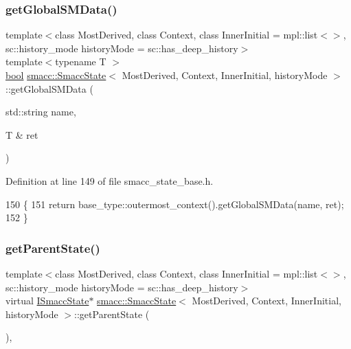 \subsubsection{\texorpdfstring{get\+Global\+S\+M\+Data()}{getGlobalSMData()}}
{\footnotesize\ttfamily template$<$class Most\+Derived, class Context, class Inner\+Initial = mpl\+::list$<$$>$, sc\+::history\+\_\+mode history\+Mode = sc\+::has\+\_\+deep\+\_\+history$>$ \\
template$<$typename T $>$ \\
\hyperlink{classbool}{bool} \hyperlink{classsmacc_1_1SmaccState}{smacc\+::\+Smacc\+State}$<$ Most\+Derived, Context, Inner\+Initial, history\+Mode $>$\+::get\+Global\+S\+M\+Data (\begin{DoxyParamCaption}\item[{std\+::string}]{name,  }\item[{T \&}]{ret }\end{DoxyParamCaption})\hspace{0.3cm}{\ttfamily [inline]}}



Definition at line 149 of file smacc\+\_\+state\+\_\+base.\+h.


\begin{DoxyCode}
150     \{
151       \textcolor{keywordflow}{return} base\_type::outermost\_context().getGlobalSMData(name, ret);
152     \}
\end{DoxyCode}
\mbox{\label{classsmacc_1_1SmaccState_a69fc0aa1dbe0c00501f2890616225004}} 
\subsubsection{\texorpdfstring{get\+Parent\+State()}{getParentState()}}
{\footnotesize\ttfamily template$<$class Most\+Derived, class Context, class Inner\+Initial = mpl\+::list$<$$>$, sc\+::history\+\_\+mode history\+Mode = sc\+::has\+\_\+deep\+\_\+history$>$ \\
virtual \hyperlink{classsmacc_1_1ISmaccState}{I\+Smacc\+State}$\ast$ \hyperlink{classsmacc_1_1SmaccState}{smacc\+::\+Smacc\+State}$<$ Most\+Derived, Context, Inner\+Initial, history\+Mode $>$\+::get\+Parent\+State (\begin{DoxyParamCaption}{ }\end{DoxyParamCaption})\hspace{0.3cm}{\ttfamily [inline]}, {\ttfamily [virtual]}}



